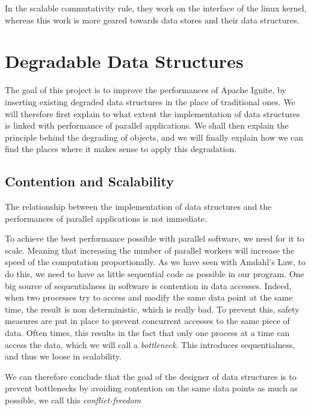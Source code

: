 \documentclass[conference]{IEEEtran}
\begin{document}
In the scalable commutativity rule, they work on the interface of the linux kernel, whereas this work is more geared towards data stores and their data structures.

\bigbreak 

\section{Degradable Data Structures}
The goal of this project is to improve the performances of Apache Ignite, by inserting existing degraded data structures \cite{degradation} in the place of traditional ones. We will therefore first explain to what extent the implementation of data structures is linked with performance of parallel applications. We shall then explain the principle behind the degrading of objects, and we will finally explain how we can find the places where it makes sense to apply this degradation.

\subsection{Contention and Scalability} 
The relationship between the implementation of data structures and the performances of parallel applications is not immediate.

To achieve the best performance possible with parallel software, we need for it to scale. Meaning that increasing the number of parallel workers will increase the speed of the computation proportionally. As we have seen with Amdahl's Law, to do this, we need to have as little sequential code as possible in our program. One big source of sequentialness in software is contention in data accesses. Indeed, when two processes try to access and modify the same data point at the same time, the result is non deterministic, which is really bad. To prevent this, safety measures are put in place to prevent concurrent accesses to the same piece of data. Often times, this results in the fact that only one process at a time can access the data, which we will call a \textit{bottleneck}. This introduces sequentialness, and thus we loose in scalability.

We can therefore conclude that the goal of the designer of data structures is to prevent bottlenecks by avoiding contention on the same data points as much as possible, we call this \textit{conflict-freedom}
\end{document}
